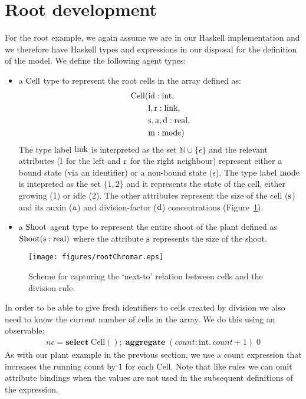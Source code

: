 \section{Root development}
\label{sec:rootDev}
For the root example, we again assume we are in our Haskell implementation and
we therefore have Haskell types and expressions in our disposal for the
definition of the model. We define the following agent types:
\begin{itemize}
\item a $\mathrm{Cell}$ type to represent the root cells in the array defined as:
  \begin{align*}
    \mathrm{Cell}(&\mathrm{id}: \mathrm{int}, \\
              &\mathrm{l, r}: \mathrm{link}, \\
              &\mathrm{s, a, d}: \mathrm{real}, \\
              &\mathrm{m}:\mathrm{mode})
    \end{align*}
    The type label $\mathrm{link}$ is interpreted as the set
    $\mathbb{N} \cup \{\epsilon\}$ and the relevant attributes ($\mathrm{l}$ for the
    left and $\mathrm{r}$ for the right neighbour) represent either a bound state
    (via an identifier) or a non-bound state ($\epsilon$). The type label
    $\mathrm{mode}$ is intepreted as the set $\{ 1, 2 \}$ and it represents the
    state of the cell, either growing (1) or idle (2). The other attributes
    represent the size of the cell ($\mathrm{s}$) and its auxin ($\mathrm{a}$) and
    division-factor ($\mathrm{d}$) concentrations (Figure~\ref{fig:rootDevChromar}).
  \item a $\mathrm{Shoot}$ agent type to represent the entire shoot of the plant
    defined as $\mathrm{Shoot}(\mathrm{s}: \mathrm{real})$ where the attribute $\mathrm{s}$
    represents the size of the shoot.
  \end{itemize}
  
\begin{figure}
    \centering
    \texttt{[image: figures/rootChromar.eps]}
    \caption{Scheme for capturing the `next-to' relation between cells and the
      division rule.}
    \label{fig:rootDevChromar}
  \end{figure}

In order to be able to give fresh identifiers to cells created by division we
also need to know the current number of cells in the array. We do this using
an observable:
\begin{align*}
nc = \mathbf{select} \; \mathrm{Cell}()\mathbf{;} \;\mathbf{aggregate} \; (count: \mathrm{int}.\, count + 1) \; 0
\end{align*}
As with our plant example in the previous section, we use a $\mathrm{count}$
expression that increases the running count by $1$ for each
$\mathrm{Cell}$. Note that like rules we can omit attribute bindings when the
values are not used in the subsequent definitions of the expression.

